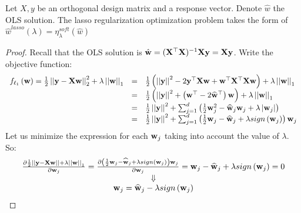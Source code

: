 \begin{claim}
	Let $X,y$ be an orthogonal design matrix and a response vector. Denote $\widehat{w}$ the OLS solution. The lasso regularization optimization problem takes the form of $\widehat{w}^{lasso}\left(\lambda\right) = \eta_{\lambda}^{soft}\left(\widehat{w}\right)$ 
\end{claim}
\begin{proof}
	Recall that the OLS solution is $\hat{\mathbf{w}} = (\mathbf{X}^\top\mathbf{X})^{-1}\mathbf{X}\mathbf{y} = \mathbf{X}\mathbf{y}$. 
	Write the objective function:
	$$
	\begin{array}{ccl}
	f_{\ell_{1}}\left(\mathbf{w}\right)=\frac{1}{2}\left|\left|\mathbf{y}-\mathbf{X}\mathbf{w}\right|\right|_{2}^{2}+\lambda\left|\left|\mathbf{w}\right|\right|_{1} & = & \frac{1}{2}\left( \left|\left|\mathbf{y}\right|\right|^2 - 2\mathbf{y}^\top \mathbf{X}\mathbf{w} + \mathbf{w}^\top \mathbf{X}^\top\mathbf{X}\mathbf{w} \right) + \lambda\left|\left|\mathbf{w}\right|\right|_{1} \\
	& = & \frac{1}{2}\left(\left|\left|\mathbf{y}\right|\right|^2 + \left(\mathbf{w}^{\top}-2\widehat{\mathbf{w}}^{\top}\right)\mathbf{w} \right) + \lambda\left|\left|\mathbf{w}\right|\right|_{1} \\
	& = & \frac{1}{2}\left|\left|\mathbf{y}\right|\right|^{2}+\sum_{j=1}^{d}\left(\frac{1}{2}\mathbf{w}_{j}^{2}-\widehat{\mathbf{w}}_{j}\mathbf{w}_{j}+\lambda\left|\mathbf{w}_{j}\right|\right)\\
	& = & \frac{1}{2}\left|\left|\mathbf{y}\right|\right|^{2}+\sum_{j=1}^{d}\left(\frac{1}{2}\mathbf{w}_{j}-\widehat{\mathbf{w}}_{j}+\lambda sign\left(\mathbf{w}_{j}\right)\right)\mathbf{w}_{j}
	\end{array}
	$$
	Let us minimize the expression for each $\mathbf{w}_{j}$ taking into account the value of $\lambda$. So: 
	$$
	\begin{array}{c}
	\frac{\partial\frac{1}{2}\left|\left|\mathbf{y}-\mathbf{X}\mathbf{w}\right|\right|+\lambda\left|\left|\mathbf{w}\right|\right|_{1}}{\partial \mathbf{w}_{j}}=\frac{\partial\left(\frac{1}{2}\mathbf{w}_{j}-\widehat{\mathbf{w}}_{j}+\lambda sign\left(\mathbf{w}_{j}\right)\right)\mathbf{w}_{j}}{\partial \mathbf{w}_{j}}=\mathbf{w}_{j}-\widehat{\mathbf{w}}_{j}+\lambda sign\left(\mathbf{w}_{j}\right)=0\\
	\Downarrow\\
	\mathbf{w}_{j}=\widehat{\mathbf{w}}_{j}-\lambda sign\left(\mathbf{w}_{j}\right)
	\end{array}
	$$
	

\end{proof}
